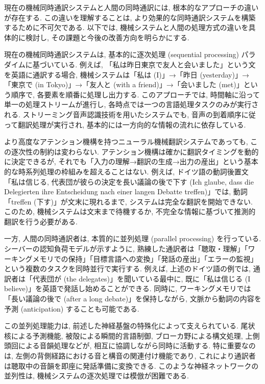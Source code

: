 現在の機械同時通訳システムと人間の同時通訳には, 根本的なアプローチの違いが存在する.
この違いを理解することは, より効果的な同時通訳システムを構築するために不可欠である.
以下では, 機械システムと人間の処理方式の違いを具体的に検討し, その課題と今後の改善方向を明らかにする.

現在の機械同時通訳システムは, 基本的に逐次処理 (sequential processing) パラダイムに基づいている.
例えば, 「私は昨日東京で友人と会いました」という文を英語に通訳する場合, 機械システムは「私は (I)」→「昨日 (yesterday)」→「東京で (in Tokyo)」→「友人と (with a friend)」→「会いました (met)」という順序で, 各要素を順番に処理し出力する.
このアプローチでは, 時間軸に沿って単一の処理ストリームが進行し, 各時点では一つの言語処理タスクのみが実行される.
ストリーミング音声認識技術を用いたシステムでも, 音声の到着順序に従って翻訳処理が実行され, 基本的には一方向的な情報の流れに依存している.

より高度なアテンション機構を持つニューラル機械翻訳システムであっても, この逐次性の制約は変わらない.
アテンション機構は確かに翻訳タイミングを動的に決定できるが, それでも「入力の理解→翻訳の生成→出力の産出」という基本的な時系列処理の枠組みを超えることはない.
例えば, ドイツ語の動詞後置文「私は信じる, 代表団が彼らの決定を長い議論の後で下す (Ich glaube, dass die Delegierten ihre Entscheidung nach einer langen Debatte treffen)」では, 動詞「treffen (下す)」が文末に現れるまで, システムは完全な翻訳を開始できない.
このため, 機械システムは文末まで待機するか, 不完全な情報に基づいて推測的翻訳を行う必要がある.

一方, 人間の同時通訳者は, 本質的に並列処理 (parallel processing) を行っている.
シーバーの認知負荷モデルが示すように, 熟練した通訳者は「聴取・理解」「ワーキングメモリでの保持」「目標言語への変換」「発話の産出」「エラーの監視」という複数のタスクを同時並行で実行する.
例えば, 上述のドイツ語の例では, 通訳者は「代表団が (the delegates)」を聞いている最中に, 既に「私は信じる (I believe)」を英語で発話し始めることができる.
同時に, ワーキングメモリでは「長い議論の後で (after a long debate)」を保持しながら, 文脈から動詞の内容を予測 (anticipation) することも可能である.

この並列処理能力は, 前述した神経基盤の特殊化によって支えられている.
尾状核による予測機能, 被殻による瞬間的言語制御, ブローカ野による構文処理, 上側頭回による音韻処理などが, 相互に協調しながら同時に活動する.
特に重要なのは, 左側の背側経路における音と構音の関連付け機能であり, これにより通訳者は聴取中の音韻を即座に発話準備に変換できる.
このような神経ネットワークの並列性は, 機械システムの逐次処理では模倣が困難である.

